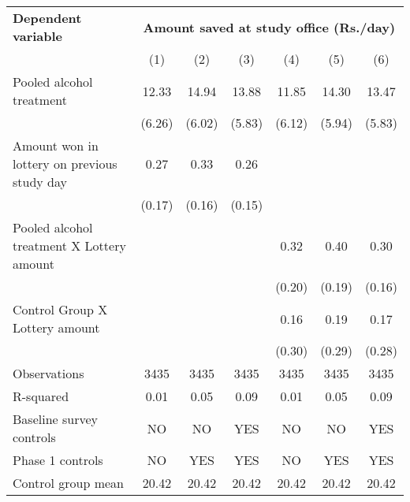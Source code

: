 \begin{tabular}{l c c c c c c} \toprule \textbf{Dependent variable} & \multicolumn{6}{c}{\textbf{Amount saved at study office (Rs./day)}} \\ \cmidrule(lr){2-7}&\multicolumn{1}{c}{(1)}&\multicolumn{1}{c}{(2)}&\multicolumn{1}{c}{(3)}&\multicolumn{1}{c}{(4)}&\multicolumn{1}{c}{(5)}&\multicolumn{1}{c}{(6)}\\
\midrule
Pooled alcohol treatment&       12.33&       14.94&       13.88&       11.85&       14.30&       13.47\\
                    &      (6.26)&      (6.02)&      (5.83)&      (6.12)&      (5.94)&      (5.83)\\
\addlinespace
Amount won in lottery on previous study day&        0.27&        0.33&        0.26&            &            &            \\
                    &      (0.17)&      (0.16)&      (0.15)&            &            &            \\
\addlinespace
Pooled alcohol treatment X Lottery amount&            &            &            &        0.32&        0.40&        0.30\\
                    &            &            &            &      (0.20)&      (0.19)&      (0.16)\\
\addlinespace
Control Group X Lottery amount&            &            &            &        0.16&        0.19&        0.17\\
                    &            &            &            &      (0.30)&      (0.29)&      (0.28)\\
\midrule
Observations        &        3435&        3435&        3435&        3435&        3435&        3435\\
R-squared           &        0.01&        0.05&        0.09&        0.01&        0.05&        0.09\\
Baseline survey controls&          NO&          NO&         YES&          NO&          NO&         YES\\
Phase 1 controls    &          NO&         YES&         YES&          NO&         YES&         YES\\
Control group mean  &       20.42&       20.42&       20.42&       20.42&       20.42&       20.42\\
\bottomrule \end{tabular} 